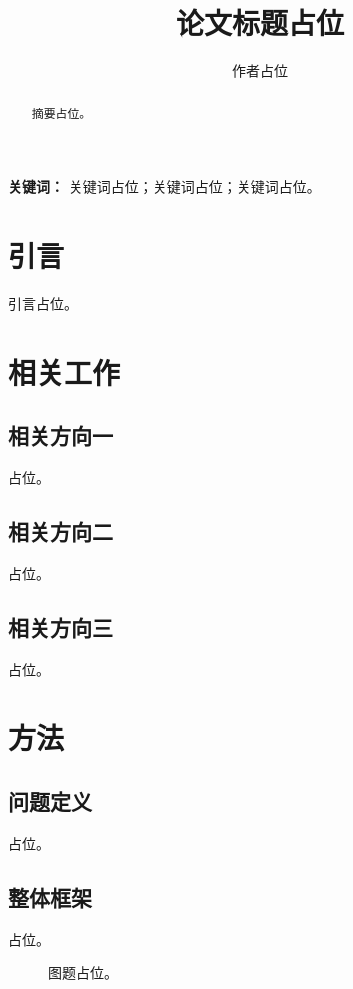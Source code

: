 \documentclass[UTF8,twocolumn]{ctexart}
\title{论文标题占位}
\author{作者占位}
\date{}
\begin{document}
\maketitle

\begin{abstract}
摘要占位。
\end{abstract}

\textbf{关键词：} 关键词占位；关键词占位；关键词占位。

\section{引言}

引言占位。

\section{相关工作}

\subsection{相关方向一}

占位。

\subsection{相关方向二}

占位。

\subsection{相关方向三}

占位。

\section{方法}

\subsection{问题定义}

占位。

\subsection{整体框架}

占位。

\begin{figure}[t]
    \centering
    \caption{图题占位。}
    \label{fig:framework}
\end{figure}
\end{document}

